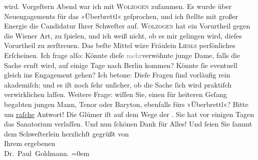 \begin{ledgroupsized}[t]{13cm}
               wird. Vorgeſtern{ }Abend war ich mit \textsc{Wolzogen} zuſammen. Es wurde über Neuengagements für das »Überbrettl« geſprochen, und ich ſtellte mit großer Energie die Candidatur
               Ihrer Schweſter auf. \textsc{Wolzogen} hat ein Vorurtheil gegen die Wiener Art, zu
               ſpielen, und ich weiß nicht, ob es mir gelingen wird, dieſes Vorurtheil zu
               zerſtreuen. Das beſte Mittel wäre Fräulein \textsc{Liesls} perſönliches Erſcheinen. Ich
               frage alſo: Könnte dieſe {\pb}\textcolor{gray}{mehr}verwöhnte junge Dame, falls die Sache ernſt wird, auf einige Tage nach Berlin kommen? Könnte ſie eventuell gleich ins Engagement gehen?\pend
           \pstart
           Ich betone: Dieſe Fragen ſind vorläufig rein akademiſch; und es iſt noch ſehr
               unſicher, ob die Sache ſich wird praktiſch verwirklichen laſſen.\pend
           \pstart
           Weitere Frage: wiſſen Sie, einen für heiteren Geſang begabten jungen Mann, {\pb}Tenor oder Baryton, ebenfalls fürs »Überbrettl«?\pend
           \pstart
           Bitte um \uline{raſche} Antwort!\pend
           \pstart
           Die Glümer iſt auf dem Wege der \label{K_L03525-17v}\label{K_L03525-17h}. Sie hat vor einigen
               Tagen das Sanatorium verlaſſen.\pend
           \pstart
           Und nun ſchönen Dank für Alles! Und ſeien Sie ſammt dem Schweſterlein herzlichſt gegrüßt von
               {\\[\baselineskip]}Ihrem ergebenen {\\[\baselineskip]}\spacefill\mbox{Dr. Paul Goldmann.}\pend
           \leftskip=0em{}
         
         \endnumbering{}\end{ledgroupsized}\begin{anhang}\end{anhang}\newcommand{\dateiname}{L03525}\newcommand{\titel}{Paul Goldmann an Olga Gussmann, 3. 4. [1901]}\newcommand{\editorInnen}{Martin Anton Müller und Laura Untner}
      